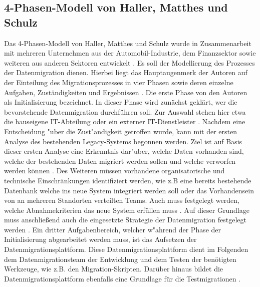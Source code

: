 
\subsection{4-Phasen-Modell von Haller, Matthes und Schulz}


Das 4-Phasen-Modell von Haller, Matthes und Schulz wurde in Zusammenarbeit mit mehreren Unternehmen aus der Automobil-Industrie, dem Finanzsektor sowie weiteren aus anderen Sektoren entwickelt \citep[S.~2f.]{klausMatthesSchulz-2012}. Es soll der Modellierung des Prozesses der Datenmigration dienen. Hierbei liegt das Hauptaugenmerk der Autoren auf der Einteilung des Migrationsprozesses in vier Phasen sowie deren einzelne Aufgaben, Zuständigkeiten und Ergebnissen \citep[S.~5f.]{klausMatthesSchulz-2012}.
\lb
Die erste Phase von den Autoren als Initialisierung bezeichnet. In dieser Phase wird zunächst geklärt, wer die bevorstehende Datenmigration durchführen soll. Zur Auswahl stehen hier etwa die hauseigene IT-Abteilung oder ein externer IT-Dienstleister \citep[S.~7]{klausMatthesSchulz-2012}. Nachdem eine Entscheidung "uber die Zust"andigkeit getroffen wurde, kann mit der ersten Analyse des bestehenden Legacy-Systems begonnen werden. Ziel ist auf Basis dieser ersten Analyse eine Erkenntnis dar"uber, welche Daten vorhanden sind, welche der bestehenden Daten migriert werden sollen und welche verworfen werden können \citep[S.~7]{klausMatthesSchulz-2012}. Des Weiteren müssen vorhandene organisatorische und technische Einschränkungen identifiziert werden, wie z.B eine bereits bestehende Datenbank welche ins neue System integriert werden soll oder das Vorhandensein von an mehreren Standorten verteilten Teams. Auch muss festgelegt werden, welche Abnahmekriterien das neue System erfüllen muss \citep[S.~7]{klausMatthesSchulz-2012}. Auf dieser Grundlage muss anschließend auch die eingesetzte Strategie der Datenmigration festgelegt werden \citep{klausMatthesSchulz-2012}. Ein dritter Aufgabenbereich, welcher  w"ahrend der Phase der Initialisierung abgearbeitet werden muss, ist das Aufsetzen der Datenmigrationsplattform. Diese Datenmigrationsplattform dient im Folgenden dem Datenmigrationsteam der Entwicklung und dem Testen der benötigten Werkzeuge, wie z.B. den Migration-Skripten. Darüber hinaus bildet die Datenmigrationsplattform ebenfalls eine Grundlage für die Testmigrationen \citep[S.~7]{klausMatthesSchulz-2012}.
\lb
